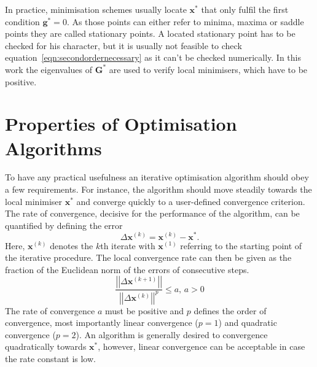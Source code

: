 In practice, minimisation schemes usually locate $\mathbf{x^*}$ that only
fulfil the first condition $\mathbf{g^*}=0$. As those points can
either refer to minima, maxima or saddle points they are called stationary
points. A located stationary point has to be checked for his character, but it
is usually not feasible to check equation~\eqref{eqn:secondordernecessary} as
it can't be checked numerically. In this work the eigenvalues of
$\mathbf{G^*}$ are used to verify local minimisers, which have to be
positive.

\section{Properties of Optimisation Algorithms}
\label{sec:PropertiesOfOptimisationAlgorithms}

To have any practical usefulness an iterative optimisation algorithm should
obey a few requirements. For instance, the algorithm should move steadily
towards the local minimiser $\mathbf{x^*}$ and converge quickly to a
user-defined convergence criterion. The rate of convergence, decisive for the
performance of the algorithm, can be quantified by defining the error
%
\begin{equation}
    \Delta\mathbf{x}^{(k)}=\mathbf{x}^{(k)}-\mathbf{x^*}.
\end{equation}
%
Here, $\mathbf{x}^{(k)}$ denotes the $k$th iterate with $\mathbf{x}^{(1)}$
referring to the starting point of the iterative procedure. The local
convergence rate can then be given as the fraction of the Euclidean norm of the
errors of consecutive steps.
%
\begin{equation}
    \frac{\left|\left|\Delta\mathbf{x}^{(k+1)}\right|\right|}{\left|\left|\Delta\mathbf{x}^{(k)}\right|\right|^{p}}\leq a, \,a>0
\end{equation}
%
The rate of convergence $a$ must be positive and $p$ defines the order of
convergence, most importantly linear convergence ($p=1$) and quadratic
convergence ($p=2$). An algorithm is generally desired to convergence
quadratically towards $\mathbf{x^*}$, however, linear convergence can be
acceptable in case the rate constant is low.

